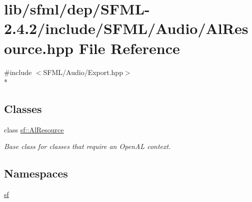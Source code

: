 \hypertarget{sfml_2dep_2_s_f_m_l-2_84_82_2include_2_s_f_m_l_2_audio_2_al_resource_8hpp}{\section{lib/sfml/dep/\-S\-F\-M\-L-\/2.4.2/include/\-S\-F\-M\-L/\-Audio/\-Al\-Resource.hpp File Reference}
\label{sfml_2dep_2_s_f_m_l-2_84_82_2include_2_s_f_m_l_2_audio_2_al_resource_8hpp}
}
{\ttfamily \#include $<$S\-F\-M\-L/\-Audio/\-Export.\-hpp$>$}\\*
\subsection*{Classes}
\begin{DoxyCompactItemize}
\item 
class \hyperlink{classsf_1_1_al_resource}{sf\-::\-Al\-Resource}
\begin{DoxyCompactList}\small\item\em Base class for classes that require an Open\-A\-L context. \end{DoxyCompactList}\end{DoxyCompactItemize}
\subsection*{Namespaces}
\begin{DoxyCompactItemize}
\item 
\hyperlink{namespacesf}{sf}
\end{DoxyCompactItemize}
